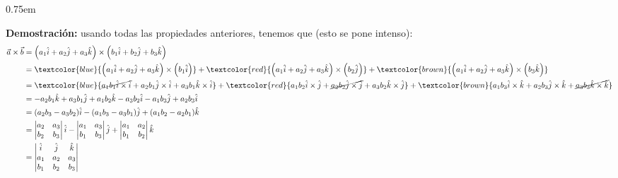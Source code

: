 \documentclass[12pt, fleqn]{report}                             %
\newenvironment{SmallIndentation}[1][0.75em]                    %
    {\begin{adjustwidth}{#1}{}\begin{footnotesize}}                 %
    {\end{footnotesize}\end{adjustwidth}}                           %
\newcommand{\Wrap}[1]{\left( #1 \right)}                        %
\begin{document}
            	\begin{SmallIndentation}
	            	\textbf{Demostración:} usando todas las propiedades anteriores, tenemos que (esto se pone intenso):
	            	\begin{align*}
		            	\vec{a} \times \vec{b} &= \Wrap{a_1\hat{i} + a_2\hat{j} + a_3\hat{k}} \times \Wrap{b_1\hat{i} + b_2\hat{j} + b_3\hat{k}}\\
		            	&= \textcolor{blue}{\Wrap{a_1\hat{i} + a_2\hat{j} + a_3\hat{k}} \times \Wrap{b_1\hat{i}}}
		            	+ \textcolor{red}{\Wrap{a_1\hat{i} + a_2\hat{j} + a_3\hat{k}} \times \Wrap{b_2\hat{j}}}
		            	+ \textcolor{brown}{\Wrap{a_1\hat{i} + a_2\hat{j} + a_3\hat{k}} \times \Wrap{b_3\hat{k}}}\\
		            	&= \textcolor{blue}{\cancel{a_1b_1\hat{i}\times\hat{i}} + a_2b_1\hat{j}\times\hat{i} + a_3b_1\hat{k}\times\hat{i}}
		            	+ \textcolor{red}{a_1b_2\hat{i}\times\hat{j} + \cancel{a_2b_2\hat{j}\times\hat{j}} + a_3b_2\hat{k}\times\hat{j}}
		            	+ \textcolor{brown}{a_1b_3\hat{i}\times\hat{k} + a_2b_3\hat{j}\times\hat{k} + \cancel{a_3b_3\hat{k}\times\hat{k}}}\\
		            	&= -a_2b_1\hat{k} + a_3b_1\hat{j} + a_1b_2\hat{k} - a_3b_2\hat{i} - a_1b_3\hat{j} + a_2b_3\hat{i}\\
		            	&= (a_2b_3 - a_3b_2)\hat{i} - (a_1b_3 - a_3b_1)\hat{j} + (a_1b_2 - a_2b_1)\hat{k}\\
		            	&= \begin{vmatrix}
			            	a_2 & a_3\\
			            	b_2 & b_3
		            	\end{vmatrix}\hat{i} - 
		            	\begin{vmatrix}
			            	a_1 & a_3\\
			            	b_1 & b_3
		            	\end{vmatrix}\hat{j} + 
		            	\begin{vmatrix}
			            	a_1 & a_2\\
			            	b_1 & b_2
		            	\end{vmatrix}\hat{k}\\
		            	&= \begin{vmatrix}
			            	\hat{i} & \hat{j} & \hat{k}\\
			            	a_1 & a_2 & a_3\\
			            	b_1 & b_2 & b_3
		            	\end{vmatrix}
	            	\end{align*}
            	\end{SmallIndentation}
            
\end{document}
